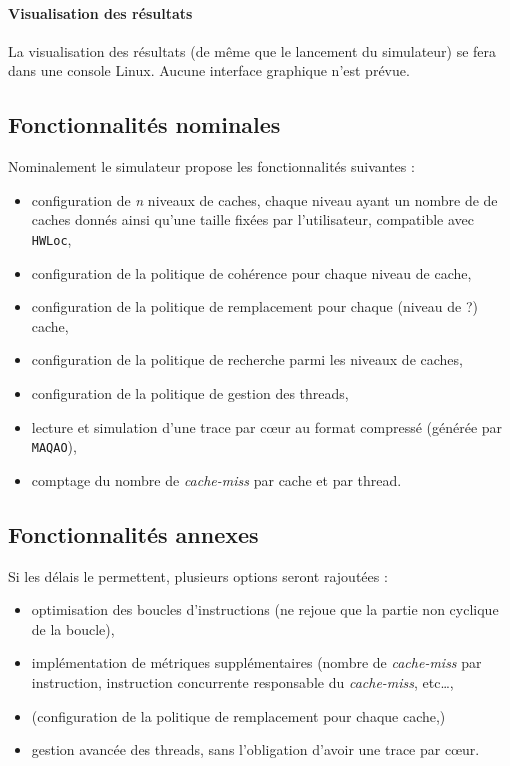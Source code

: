 \paragraph{Visualisation des résultats}
La visualisation des résultats (de même que le lancement du simulateur) se fera dans une console Linux. Aucune interface graphique n'est prévue.

\subsection{Fonctionnalités nominales}
Nominalement le simulateur propose les fonctionnalités suivantes :
\begin{itemize}
\item{configuration de \emph{n} niveaux de caches, chaque niveau ayant un nombre de de caches donnés ainsi qu'une taille fixées par l'utilisateur, compatible avec \texttt{HWLoc},}
\item{configuration de la politique de cohérence pour chaque niveau de cache,}
\item{configuration de la politique de remplacement pour chaque (niveau de ?) cache,}
\item{configuration de la politique de recherche parmi les niveaux de caches,}
\item{configuration de la politique de gestion des threads,}
\item{lecture et simulation d'une trace par c\oe ur au format compressé (générée par \texttt{MAQAO}),}
\item{comptage du nombre de \emph{cache-miss} par cache et par thread.}
\end{itemize}


\subsection{Fonctionnalités annexes}
Si les délais le permettent, plusieurs options seront rajoutées :
\begin{itemize}
\item{optimisation des boucles d'instructions (ne rejoue que la partie non cyclique de la boucle),}
\item{implémentation de métriques supplémentaires (nombre de \emph{cache-miss} par instruction, instruction concurrente responsable du \emph{cache-miss}, etc\ldots,}
\item{(configuration de la politique de remplacement pour chaque cache,)}
\item{gestion avancée des threads, sans l'obligation d'avoir une trace par c\oe ur.}
\end{itemize}
